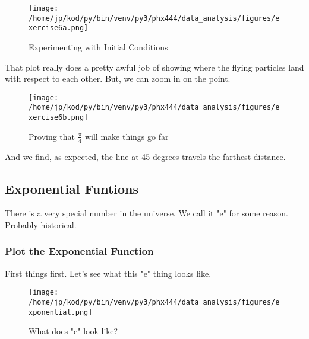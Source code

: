 \documentclass{article}
\begin{document}
\begin{figure}[H]
        \begin{center}
        \texttt{[image: /home/jp/kod/py/bin/venv/py3/phx444/data\_analysis/figures/exercise6a.png]}
        \caption{Experimenting with Initial Conditions}
        \label{fig:fig_9}
        \end{center}
\end{figure}

That plot really does a pretty awful job of showing where the flying particles
land with respect to each other. But, we can zoom in on the point.


\begin{figure}[H]
        \begin{center}
        \texttt{[image: /home/jp/kod/py/bin/venv/py3/phx444/data\_analysis/figures/exercise6b.png]}
        \caption{Proving that $\frac{\pi}{4}$ will make things go far}
        \label{fig:fig_10}
        \end{center}
\end{figure}

And we find, as expected, the line at 45 degrees travels the farthest distance.

\subsection{Exponential Funtions}
There is a very special number in the universe. We call it "e" for some reason.
Probably historical.

\subsubsection{Plot the Exponential Function}
First things first. Let's see what this "e" thing looks like.

\begin{figure}[H]
        \begin{center}
        \texttt{[image: /home/jp/kod/py/bin/venv/py3/phx444/data\_analysis/figures/exponential.png]}
        \caption{What does "e" look like?}
        \label{fig:fig_11}
        \end{center}
\end{figure}
\end{document}

